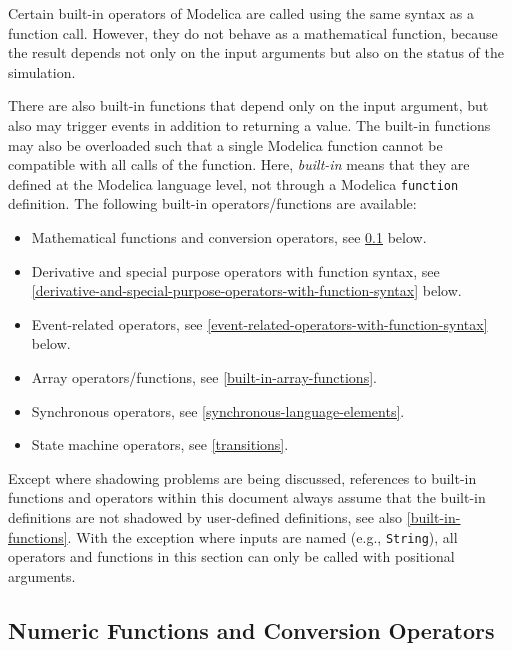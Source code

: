Certain built-in operators of Modelica are called using the same syntax as a function call.
However, they do not behave as a mathematical function, because the result depends not only on the input arguments but also on the status of the simulation.

There are also built-in functions that depend only on the input argument, but also may trigger events in addition to returning a value.
The built-in functions may also be overloaded such that a single Modelica function cannot be compatible with all calls of the function.
Here, \emph{built-in} means that they are defined at the Modelica language level, not through a Modelica \lstinline!function! definition.
The following built-in operators/functions are available:
\begin{itemize}
\item
  Mathematical functions and conversion operators, see \cref{numeric-functions-and-conversion-functions} below.
\item
  Derivative and special purpose operators with function syntax, see \cref{derivative-and-special-purpose-operators-with-function-syntax} below.
\item
  Event-related operators, see \cref{event-related-operators-with-function-syntax} below.
\item
  Array operators/functions, see \cref{built-in-array-functions}.
\item
  Synchronous operators, see \cref{synchronous-language-elements}.
\item
  State machine operators, see \cref{transitions}.
\end{itemize}

Except where shadowing problems are being discussed, references to built-in functions and operators within this document always assume that the built-in definitions are not shadowed by user-defined definitions, see also \cref{built-in-functions}.
With the exception where inputs are named (e.g., \lstinline!String!), all operators and functions in this section can only be called with positional arguments.

\subsection{Numeric Functions and Conversion Operators}\label{numeric-functions-and-conversion-functions}

